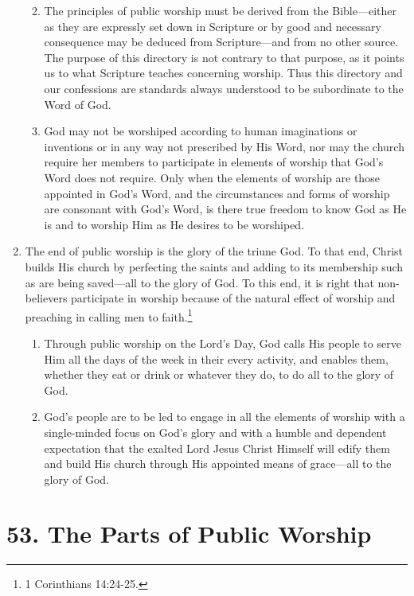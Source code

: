 \documentclass[
]{book}
\providecommand{\tightlist}{%
  \setlength{\itemsep}{0pt}\setlength{\parskip}{0pt}}
\begin{document}
\begin{enumerate}
  \begin{enumerate}
  \def\labelenumii{\alph{enumii}.}
  \tightlist
  \item
    The principles of public worship must be derived from the Bible---either as they are expressly set down in Scripture or by good and necessary consequence may be deduced from Scripture---and from no other source. The purpose of this directory is not contrary to that purpose, as it points us to what Scripture teaches concerning worship. Thus this directory and our confessions are standards always understood to be subordinate to the Word of God.
  \item
    God may not be worshiped according to human imaginations or inventions or in any way not prescribed by His Word, nor may the church require her members to participate in elements of worship that God's Word does not require. Only when the elements of worship are those appointed in God's Word, and the circumstances and forms of worship are consonant with God's Word, is there true freedom to know God as He is and to worship Him as He desires to be worshiped.
  \end{enumerate}
\item
  The end of public worship is the glory of the triune God. To that end, Christ builds His church by perfecting the saints and adding to its membership such as are being saved---all to the glory of God. To this end, it is right that non-believers participate in worship because of the natural effect of worship and preaching in calling men to faith.\footnote{1 Corinthians 14:24-25.}

  \begin{enumerate}
  \def\labelenumii{\alph{enumii}.}
  \tightlist
  \item
    Through public worship on the Lord's Day, God calls His people to serve Him all the days of the week in their every activity, and enables them, whether they eat or drink or whatever they do, to do all to the glory of God.
  \item
    God's people are to be led to engage in all the elements of worship with a single-minded focus on God's glory and with a humble and dependent expectation that the exalted Lord Jesus Christ Himself will edify them and build His church through His appointed means of grace---all to the glory of God.
  \end{enumerate}
\end{enumerate}

\hypertarget{the-parts-of-public-worship}{%
\section*{53. The Parts of Public Worship}\label{the-parts-of-public-worship}}
\end{document}

